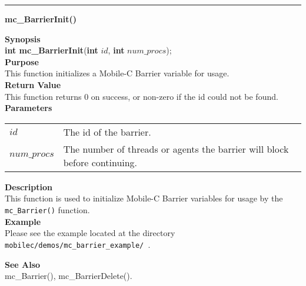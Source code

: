 \noindent
\vspace{5pt}
\rule{6.5in}{0.015in}
\noindent
{}
{\LARGE \bf mc\_BarrierInit()}\\
\label{api:mc_BarrierInit()}

\noindent
{\bf Synopsis}\\
{\bf int mc\_BarrierInit}({\bf int} $id$, {\bf int} $num\_procs$);\\

\noindent
{\bf Purpose}\\
This function initializes a Mobile-C Barrier variable for usage. \\

\noindent
{\bf Return Value}\\
This function returns 0 on success, or non-zero if the id could not be found. \\

\noindent
{\bf Parameters}
\vspace{-0.1pt}
\begin{description}
\item
\begin{tabular}{p{20 mm}p{145 mm}} 
$id$ & The id of the barrier. \\
$num\_procs$ & The number of threads or agents the barrier will block before
  continuing.
\end{tabular}
\end{description}

\noindent
{\bf Description}\\
This function is used to initialize Mobile-C Barrier variables for usage
by the \texttt{mc\_Barrier()} function. 
    \\

\noindent
{\bf Example}\\
Please see the example located at the directory
\texttt{ mobilec/demos/mc\_barrier\_example/ }. \\

\noindent

\noindent
{\bf See Also}\\
mc\_Barrier(), mc\_BarrierDelete(). \\

